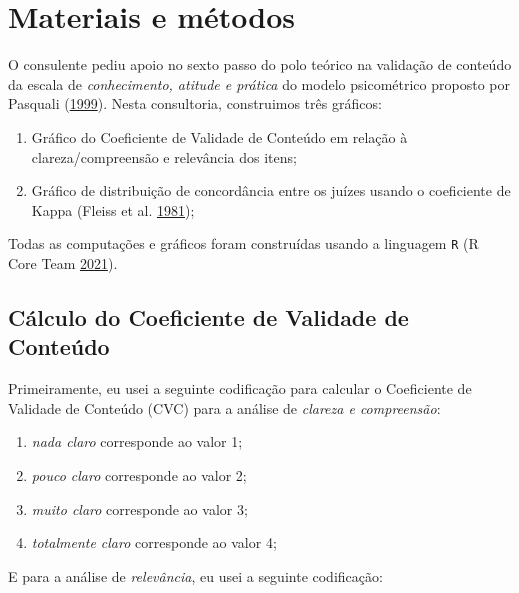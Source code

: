 \documentclass[
]{article}
\providecommand{\tightlist}{%
  \setlength{\itemsep}{0pt}\setlength{\parskip}{0pt}}
\begin{document}
\hypertarget{materiais-e-muxe9todos}{%
\section{Materiais e métodos}\label{materiais-e-muxe9todos}}

O consulente pediu apoio no sexto passo do polo teórico na validação de conteúdo da escala de \emph{conhecimento, atitude e prática } do modelo psicométrico proposto por Pasquali (\protect\hyperlink{ref-pasquali1999elaboraccao}{1999}). Nesta consultoria, construimos três gráficos:

\begin{enumerate}
\def\labelenumi{\arabic{enumi}.}
\tightlist
\item
  Gráfico do Coeficiente de Validade de Conteúdo em relação à clareza/compreensão e relevância dos itens;
\item
  Gráfico de distribuição de concordância entre os juízes usando o coeficiente de Kappa (Fleiss et al. \protect\hyperlink{ref-fleiss1981measurement}{1981});
\end{enumerate}

Todas as computações e gráficos foram construídas usando a linguagem \texttt{R} (R Core Team \protect\hyperlink{ref-Rlang}{2021}).

\hypertarget{cuxe1lculo-do-coeficiente-de-validade-de-conteuxfado}{%
\subsection{Cálculo do Coeficiente de Validade de Conteúdo}\label{cuxe1lculo-do-coeficiente-de-validade-de-conteuxfado}}

Primeiramente, eu usei a seguinte codificação para calcular o Coeficiente de Validade de Conteúdo (CVC) para a análise de \emph{clareza e compreensão}:

\begin{enumerate}
\def\labelenumi{\arabic{enumi}.}
\tightlist
\item
  \emph{nada claro} corresponde ao valor 1;
\item
  \emph{pouco claro} corresponde ao valor 2;
\item
  \emph{muito claro} corresponde ao valor 3;
\item
  \emph{totalmente claro} corresponde ao valor 4;
\end{enumerate}

E para a análise de \emph{relevância}, eu usei a seguinte codificação:
\end{document}
